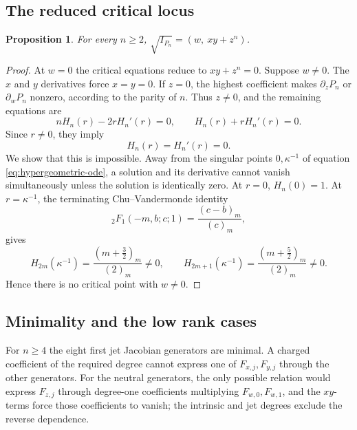 \documentclass[10pt,reqno]{amsart}
\numberwithin{equation}{section}
\theoremstyle{plain}
\newtheorem{proposition}[theorem]{Proposition}
\theoremstyle{definition}
\begin{document}
\subsection{The reduced critical locus}

\begin{proposition}\label{prop:A1crit}
For every $n\ge2$, $\sqrt{I_{P_n}}=(w,\ xy+z^n)$.
\end{proposition}

\begin{proof}
At $w=0$ the critical equations reduce to $xy+z^n=0$. Suppose $w\neq0$. The $x$ and $y$ derivatives force $x=y=0$. If $z=0$, the highest coefficient makes $\partial_zP_n$ or $\partial_wP_n$ nonzero, according to the parity of $n$. Thus $z\neq0$, and the remaining equations are
\begin{equation*}
	nH_n(r)-2rH_n'(r)=0,\qquad H_n(r)+rH_n'(r)=0 .
\end{equation*}
Since $r\neq0$, they imply 
\begin{equation*}
    H_n(r)=H_n'(r)=0 .
\end{equation*}
We show that this is impossible. Away from the singular points $0,\kappa^{-1}$ of equation \eqref{eq:hypergeometric-ode}, a solution and its derivative cannot vanish simultaneously unless the solution is identically zero. At $r=0$, $H_n(0)=1$. At $r=\kappa^{-1}$, the terminating Chu--Vandermonde identity \cite{AAR}
\begin{equation}\label{eq:vandermonde}
	{}_2F_1(-m,b;c;1)=\frac{(c-b)_m}{(c)_m},
\end{equation}
gives
\begin{equation*}
	H_{2m}(\kappa^{-1})=\frac{(m+\frac32)_m}{(2)_m}\neq0,\qquad H_{2m+1}(\kappa^{-1})=\frac{(m+\frac52)_m}{(2)_m}\neq0 .
\end{equation*}
Hence there is no critical point with $w\neq0$.
\end{proof}

\subsection{Minimality and the low rank cases}\label{sec:A1-min}

For $n\ge4$ the eight first jet Jacobian generators are minimal. A charged coefficient of the required degree cannot express one of $F_{x,j},F_{y,j}$ through the other generators. For the neutral generators, the only possible relation would express $F_{z,j}$ through degree-one coefficients multiplying $F_{w,0},F_{w,1}$, and the $xy$-terms force those coefficients to vanish; the intrinsic and jet degrees exclude the reverse dependence.
\end{document}
